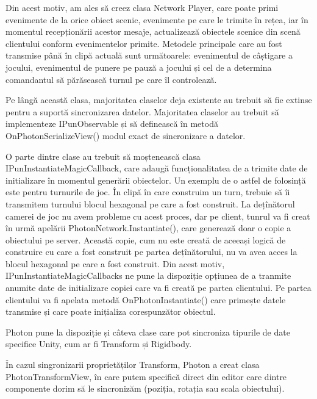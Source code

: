 \documentclass[12pt, a4paper]{article}
\begin{document}
	Din acest motiv, am ales să creez clasa Network Player, care poate primi evenimente de la orice obiect scenic, evenimente pe care le trimite în rețea, iar în momentul recepționării acestor mesaje, actualizează obiectele scenice din scenă clientului conform evenimentelor primite. Metodele principale care au fost transmise până în clipă actuală sunt următoarele: evenimentul de câștigare a jocului, evenimentul de punere pe pauză a jocului și cel de a determina comandantul să părăsească turnul pe care îl controlează.
	\newline
	
	Pe lângă această clasa, majoritatea claselor deja existente au trebuit să fie extinse pentru a suportă sincronizarea datelor. Majoritatea claselor au trebuit să implementeze IPunObservable și să definească în metodă OnPhotonSerializeView() modul exact de sincronizare a datelor.
	\newline
	
	O parte dintre clase au trebuit să moștenească clasa IPunInstantiateMagicCallback, care adaugă funcționalitatea de a trimite date de initializare în momentul generării obiectelor. Un exemplu de o astfel de folosință este pentru turnurile de joc. În clipă în care construim un turn, trebuie să îi transmitem turnului blocul hexagonal pe care a fost construit. La dețînătorul camerei de joc nu avem probleme cu acest proces, dar pe client, tunrul va fi creat în urmă apelării PhotonNetwork.Instantiate(), care generează doar o copie a obiectului pe server. Această copie, cum nu este creată de aceeași logică de construire cu care a fost construit pe partea dețînătorului, nu va avea acces la blocul hexagonal pe care a fost construit. Din acest motiv, IPunInstantiateMagicCallbacks ne pune la dispoziție opțiunea de a tranmite anumite date de initializare copiei care va fi creată pe partea clientului. Pe partea clientului va fi apelata metodă OnPhotonInstantiate() care primește datele transmise și care poate inițializa corespunzător obiectul.
	\newline
	
	Photon pune la dispoziție și câteva clase care pot sincroniza tipurile de date specifice Unity, cum ar fi Transform și Rigidbody. 
	\newline
	
	În cazul singronizarii proprietăților Transform, Photon a creat clasa PhotonTransformView, în care putem specifică direct din editor care dintre componente dorim să le sincronizăm (poziția, rotația sau scala obiectului). 
	\newline
	
\end{document}
